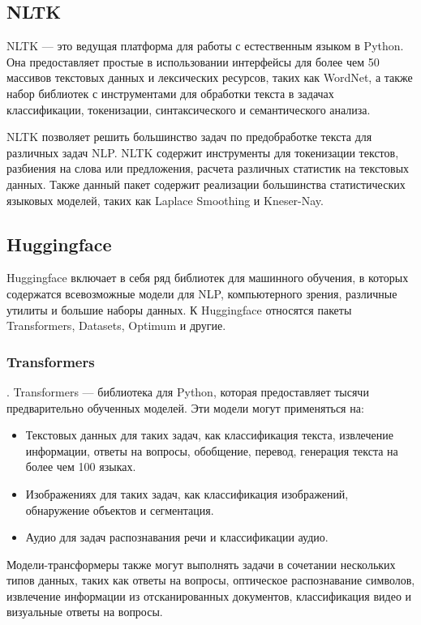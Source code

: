 \subsection{NLTK}

NLTK --- это ведущая платформа для работы с естественным языком в Python. Она предоставляет простые в использовании интерфейсы для более чем 50 массивов текстовых данных и лексических ресурсов, таких как WordNet, а также набор библиотек с инструментами для обработки текста в задачах классификации, токенизации, синтаксического и семантического анализа.

NLTK позволяет решить большинство задач по предобработке текста для различных задач NLP. NLTK содержит инструменты для токенизации текстов, разбиения на слова или предложения, расчета различных статистик на текстовых данных. Также данный пакет содержит реализации большинства статистических языковых моделей, таких как Laplace Smoothing и Kneser-Nay.

\subsection{Huggingface}

Huggingface включает в себя ряд библиотек для машинного обучения, в которых содержатся всевозможные модели для NLP, компьютерного зрения, различные утилиты и большие наборы данных. К Huggingface относятся пакеты Transformers, Datasets, Optimum и другие.

\subsubsection{Transformers}. Transformers --- библиотека для Python, которая предоставляет тысячи предварительно обученных моделей. Эти модели могут применяться на:
\begin{itemize}
	\item Текстовых данных для таких задач, как классификация текста, извлечение информации, ответы на вопросы, обобщение, перевод, генерация текста на более чем 100 языках.
	\item Изображениях для таких задач, как классификация изображений, обнаружение объектов и сегментация.
	\item Аудио для задач распознавания речи и классификации аудио.
\end{itemize}

Модели-трансформеры также могут выполнять задачи в сочетании нескольких типов данных, таких как ответы на вопросы, оптическое распознавание символов, извлечение информации из отсканированных документов, классификация видео и визуальные ответы на вопросы.

